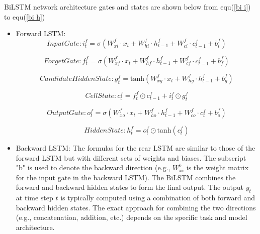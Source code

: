 \documentclass[a4paper,fleqn]{cas-sc}
\begin{document}
BiLSTM network architecture gates and states are shown below from equ(\ref{bi i}) to equ(\ref{bi h})
\begin{itemize}
  \item  Forward LSTM:\\

    \begin{equation} \label{bi i}
      Input Gate : i_t^f = \sigma(W_{xi}^f \cdot x_t + W_{hi}^f \cdot h_{t-1}^f + W_{ci}^f \cdot c_{t-1}^f + b_i^f)
    \end{equation}

    \begin{equation}
      Forget Gate : f_t^f = \sigma(W_{xf}^f \cdot x_t + W_{hf}^f \cdot h_{t-1}^f + W_{cf}^f \cdot c_{t-1}^f + b_f^f) 
    \end{equation}

    \begin{equation}
      Candidate Hidden State :  g_t^f = \text{tanh}(W_{xg}^f \cdot x_t + W_{hg}^f \cdot h_{t-1}^f + b_g^f)
    \end{equation}

    \begin{equation}
      Cell State : c_t^f = f_t^f \odot c_{t-1}^f + i_t^f \odot g_t^f
    \end{equation}

    \begin{equation}
      Output Gate : o_t^f = \sigma(W_{xo}^f \cdot x_t + W_{ho}^f \cdot h_{t-1}^f + W_{co}^f \cdot c_t^f + b_o^f)
    \end{equation}

    \begin{equation} \label{bi h}
      Hidden State :  h_t^f = o_t^f \odot \text{tanh}(c_t^f) 
    \end{equation}

  \item Backward LSTM:
  The formulas for the rear LSTM are similar to those of the forward LSTM but with different sets of weights and biases. The subscript "b" is used to denote the backward direction (e.g., \(W_{xi}^b\) is the weight matrix for the input gate in the backward LSTM). The BiLSTM combines the forward and backward hidden states to form the final output. The output \(y_t\) at time step \(t\) is typically computed using a combination of both forward and backward hidden states. The exact approach for combining the two directions (e.g., concatenation, addition, etc.) depends on the specific task and model architecture.
\end{itemize}
\end{document}
